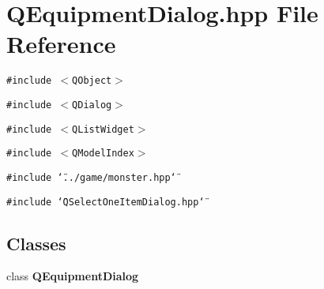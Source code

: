 \section{QEquipment\-Dialog.hpp File Reference}
\label{QEquipmentDialog_8hpp}
{\tt \#include $<$QObject$>$}\par
{\tt \#include $<$QDialog$>$}\par
{\tt \#include $<$QList\-Widget$>$}\par
{\tt \#include $<$QModel\-Index$>$}\par
{\tt \#include \char`\"{}../game/monster.hpp\char`\"{}}\par
{\tt \#include \char`\"{}QSelect\-One\-Item\-Dialog.hpp\char`\"{}}\par
\subsection*{Classes}
\begin{CompactItemize}
\item 
class {\bf QEquipment\-Dialog}
\end{CompactItemize}
